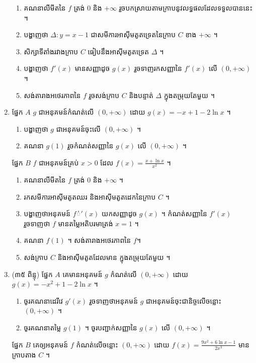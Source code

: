 \documentclass{officialexam}
\begin{document}
\begin{enumerate}[I]
	\begin{enumerate}[k]
		\item គណនាលីមីតនៃ $f$ ត្រង់ $0$ និង $+\infty$ រួចបកស្រាយតាមក្រាបនូវលទ្ធផលដែលទទួលបាននេះ ។
		\item បង្ហាញថា $\Delta: y=x-1$ ជាសមីការអាស៊ីមតូតទ្រេតនៃក្រាប $C$ ខាង $+\infty$ ។
		\item សិក្សាទីតាំងរវាងក្រាប $C$ ធៀបនឹងអាស៊ីមតូតទ្រេត $\Delta$ ។
		\item បង្ហាញថា $f'(x)$ មានសញ្ញាដូច $g(x)$ រួចទាញរកសញ្ញានៃ $f'(x)$ លើ $(0, +\infty)$ ។
		\item សង់តារាងអថេរភាពនៃ $f$ រួចសង់ក្រាប $C$ និងបន្ទាត់ $\Delta$ ក្នុងតម្រុយតែមួយ ។
	\end{enumerate}
	\item {\color{khtug} \sffamily ផ្នែក $A$} $g$ ជាអនុគមន៍កំណត់លើ $(0,+\infty)$ ដោយ $g(x)=-x+1-2\ln x$ ។
	\begin{enumerate}[k]
		\item បង្ហាញថា $g$ ជាអនុគមន៍ចុះលើ $(0,+\infty)$ ។
		\item គណនា $g(1)$ រួចកំណត់សញ្ញានៃ $g(x)$ លើ $(0, +\infty)$ ។
	\end{enumerate}
	{\color{khtug} \sffamily ផ្នែក $B$} $f$ ជាអនុគមន៍គ្រប់ $x>0$ ដែល $f(x)=\frac{x+\ln x}{x^2}$ ។​
	\begin{enumerate}[k]
		\item គណនាលីមីតនៃ $f$ ត្រង់ $0$ និង $+\infty$ ។
		\item រកសមីការអាស៊ីមតូតឈរ និងអាស៊ីមតូតដេកនៃក្រាប $C$ ។
		\item បង្ហាញថាអនុគមន៍ $f់'(x)$ យកសញ្ញាដូច $g(x)$ ។ កំណត់សញ្ញានៃ $f'(x)$ រួចទាញថា $f$ មានតម្លៃអតិបរមាត្រង់ $x=1$ ។ 
		\item គណនា $f(1)$ ។ សង់តារាងអថេរភាពនៃ $f$​។
		\item សង់ក្រាប $C$ និងអាស៊ីមតូតដែលមាន ក្នុងតម្រុយតែមួយ ។
	\end{enumerate}
	\item {\color{khtug}(៣៥ ពិន្ទុ) \sffamily ផ្នែក $A$} គេមានអនុគមន៍ $g$ កំណត់លើ $(0, +\infty)$ ដោយ $g(x)=-x^2+1-2\ln x$ ។
	\begin{enumerate}[k]
		\item ចូរគណនាដេរីវេ $g'(x)$ រួចទាញថាអនុគមន៍ $g$ ជាអនុគមន៍ចុះជានិច្ចលើចន្លោះ $(0,+\infty)$ ។ 
		\item ចូរគណនាតម្លៃ $g(1)$ ។ ចូរបញ្ជាក់សញ្ញានៃ $g(x)$ លើ $(0, +\infty)$ ។
	\end{enumerate}
	{\color{khtug} \sffamily ផ្នែក $B$} គេឲ្យអនុគមន៍ $f$ កំណត់លើចន្លោះ $(0, +\infty)$ ដោយ $f(x)=\frac{9x^2+6\ln x-1}{2x^3}$ មានក្រាបតាង $C$ ។

\end{enumerate}
\end{document}
